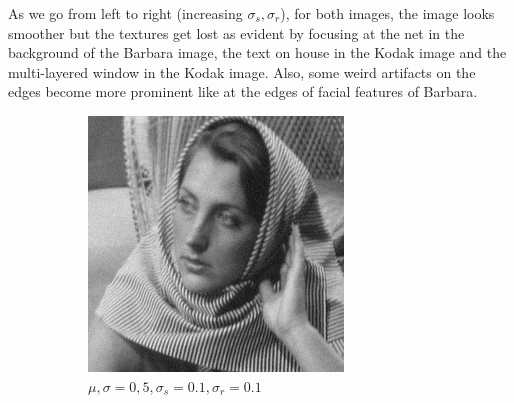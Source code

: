 \documentclass[a4paper, landscape]{article}
\begin{document}
As we go from left to right (increasing $\sigma_s, \sigma_r$), for both images, the image looks smoother but the textures get lost as evident by focusing at the net in the background of the Barbara image, the text on house in the Kodak image and the multi-layered window in  the Kodak image. Also, some weird artifacts on the edges become more prominent like at the edges of facial features of Barbara.
\begin{figure}
    \centering
    \begin{subfigure}{0.33\linewidth}
        \centering
        \includegraphics[width=\linewidth]{barbara256,σ_noise5,σ_spatial0.1,σ_range0.1.png}
        \caption{$\mu, \sigma = 0, 5, \sigma_s=0.1, \sigma_r=0.1$}
    \end{subfigure}
    \begin{subfigure}{0.33\linewidth}
        \centering

\end{subfigure}
\end{figure}
\end{document}
